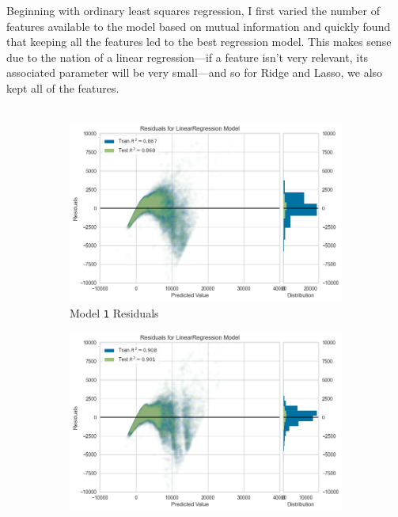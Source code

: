 \documentclass[11pt,letterpaper]{article}
\begin{document}
Beginning with ordinary least squares regression, I first varied the 
number of features available to the model based on mutual information and quickly 
found that keeping all the features led to the best regression model. This makes 
sense due to the nation of a linear regression—if a feature isn't very relevant, 
its associated parameter will be very small—and so for Ridge and Lasso, we also
kept all of the features. \\\\
\begin{figure}[H]
    \centering
    \begin{subfigure}[b]{0.475\textwidth}
        \centering
        \includegraphics[width=\textwidth]{../Figures/question4/linresplot1.png}
        \caption[Network2]%
        {{Model \texttt{1} Residuals }}    
    \end{subfigure}
    \hfill
    \begin{subfigure}[b]{0.475\textwidth}  
        \centering 
        \includegraphics[width=\textwidth]{../Figures/question4/linresplot2.png}

\end{subfigure}
\end{figure}
\end{document}
